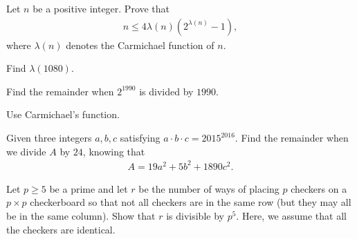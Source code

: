 \documentclass{subfile}
\begin{document}

	\begin{problem} %
		Let $n$ be a positive integer. Prove that
		\begin{align*}
		n\le 4\lambda(n)\left(2^{\lambda(n)}-1\right),
		\end{align*}
		where $\lambda(n)$ denotes the Carmichael function of $n$.
	\end{problem}

	\begin{problem}
		Find $\lambda(1080)$.
	\end{problem}

	\begin{problem}[RMO 1990]%
		Find the remainder when $2^{1990}$ is divided by $1990$.
	\end{problem}

	\begin{hint}
		Use Carmichael's function.
	\end{hint}

	\begin{problem} %
		Given three integers $a,b,c$ satisfying $a\cdot b\cdot c=2015^{2016}$. Find the remainder when we divide $A$ by $24$, knowing that
		\begin{align*}
		A=19a^2+5b^2+1890c^2.
		\end{align*}
	\end{problem}

	\begin{problem}[APMO 2006] %
		Let $p\ge5$ be a prime and let $r$ be the number of ways of placing $p$ checkers on a $p\times p$ checkerboard so that not all checkers are in the same row (but they may all be in the same column). Show that $r$ is divisible by $p^5$. Here, we assume that all the checkers are identical.
	\end{problem}
\end{document}
